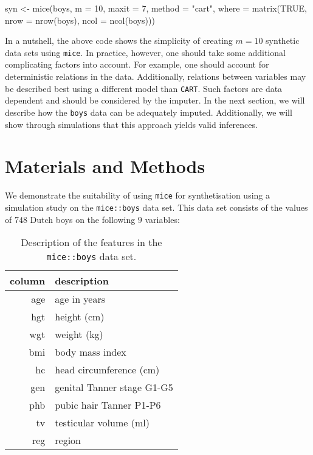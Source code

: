 \documentclass[psych,article,submit,moreauthors,pdftex]{mdpi}
\newenvironment{Shaded}{\begin{snugshade}}{\end{snugshade}}
\newcommand{\AttributeTok}[1]{\textcolor[rgb]{0.77,0.63,0.00}{#1}}
\newcommand{\ConstantTok}[1]{\textcolor[rgb]{0.00,0.00,0.00}{#1}}
\newcommand{\DecValTok}[1]{\textcolor[rgb]{0.00,0.00,0.81}{#1}}
\newcommand{\FunctionTok}[1]{\textcolor[rgb]{0.00,0.00,0.00}{#1}}
\newcommand{\NormalTok}[1]{#1}
\newcommand{\OtherTok}[1]{\textcolor[rgb]{0.56,0.35,0.01}{#1}}
\newcommand{\StringTok}[1]{\textcolor[rgb]{0.31,0.60,0.02}{#1}}
\begin{document}
\begin{Shaded}
\begin{Highlighting}[]
\NormalTok{syn }\OtherTok{\textless{}{-}} \FunctionTok{mice}\NormalTok{(boys, }
            \AttributeTok{m =} \DecValTok{10}\NormalTok{,}
            \AttributeTok{maxit =} \DecValTok{7}\NormalTok{, }
            \AttributeTok{method =} \StringTok{"cart"}\NormalTok{,}
            \AttributeTok{where =} \FunctionTok{matrix}\NormalTok{(}\ConstantTok{TRUE}\NormalTok{, }
                           \AttributeTok{nrow =} \FunctionTok{nrow}\NormalTok{(boys),}
                           \AttributeTok{ncol =} \FunctionTok{ncol}\NormalTok{(boys)))}
\end{Highlighting}
\end{Shaded}

In a nutshell, the above code shows the simplicity of creating
\(m = 10\) synthetic data sets using \texttt{mice}. In practice,
however, one should take some additional complicating factors into
account. For example, one should account for deterministic relations in
the data. Additionally, relations between variables may be described
best using a different model than \texttt{CART}. Such factors are data
dependent and should be considered by the imputer. In the next section,
we will describe how the \texttt{boys} data can be adequately imputed.
Additionally, we will show through simulations that this approach yields
valid inferences.

\hypertarget{materials-and-methods}{%
\section{Materials and Methods}\label{materials-and-methods}}

We demonstrate the suitability of using \texttt{mice} for synthetisation
using a simulation study on the \texttt{mice::boys} data set. This data
set consists of the values of \(748\) Dutch boys on the following \(9\)
variables:

\begin{table}[H]
\caption{Description of the features in the \texttt{mice::boys} data set.}
\centering
\begin{tabular}{rl}
\hline
column & description                \\ 
\hline
age    & age in years               \\ 
hgt    & height (cm)                \\ 
wgt    & weight (kg)                \\ 
bmi    & body mass index            \\ 
hc     & head circumference (cm)    \\ 
gen    & genital Tanner stage G1-G5 \\ 
phb    & pubic hair Tanner P1-P6    \\ 
tv     & testicular volume (ml)     \\ 
reg    & region                     \\ 
\hline
\end{tabular}
\end{table}
\end{document}
